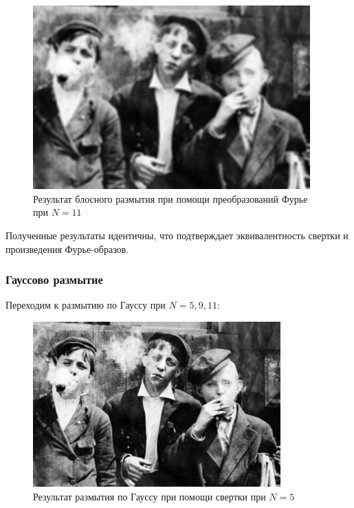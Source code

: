 \begin{figure}[ht!]
    \centering
    \includegraphics[width=0.95\textwidth]{images/result/task_2/Averaging_fourier_11.png}
    \caption{Результат блосного размытия при помощи преобразований Фурье при $N=11$}
    \label{fig:av_f_11}
\end{figure}
Полученные результаты идентичны, что подтверждает эквивалентность свертки и произведения Фурье-образов.
\clearpage
\subsubsection{Гауссово размытие}

Переходим к размытию по Гауссу при $N=5, 9, 11$:
\begin{figure}[ht!]
    \centering
    \includegraphics[width=0.85\textwidth]{images/result/task_2/Gaussian_5.png}
    \caption{Результат размытия по Гауссу при помощи свертки при $N=5$}
    \label{fig:ga_c_5}
\end{figure}

